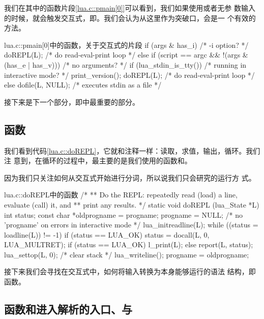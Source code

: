 我们在其中的函数片段\ref{lua.c::pmain[0]}可以看到，我们如果使用或者无参
数输入的时候，就会触发交互式，即。我们会认为从这里作为突破口，会是一
个有效的方法。

\begin{ccode}{lua.c::pmain[0]}{中的函数，关于交互式的片段}
  if (args & has_i)  /* -i option? */
    doREPL(L);  /* do read-eval-print loop */
  else if (script == argc && !(args & (has_e | has_v))) {  /* no arguments? */
    if (lua_stdin_is_tty()) {  /* running in interactive mode? */
      print_version();
      doREPL(L);  /* do read-eval-print loop */
    }
    else dofile(L, NULL);  /* executes stdin as a file */
  }
\end{ccode}

接下来是下一个部分，即中最重要的部分。


\subsection{函数}

我们看到代码\ref{lua.c::doREPL}，它就和注释一样：读取，求值，输出，循环。我们注
意到，在循环的过程中，最主要的是我们使用的函数和。

因为我们只关注如何从交互式开始进行分词，所以说我们只会研究的运行方
式。

\begin{ccode}{lua.c::doREPL}{中的函数}
/*
** Do the REPL: repeatedly read (load) a line, evaluate (call) it, and
** print any results.
*/
static void doREPL (lua_State *L) {
  int status;
  const char *oldprogname = progname;
  progname = NULL;  /* no 'progname' on errors in interactive mode */
  lua_initreadline(L);
  while ((status = loadline(L)) != -1) {
    if (status == LUA_OK)
      status = docall(L, 0, LUA_MULTRET);
    if (status == LUA_OK) l_print(L);
    else report(L, status);
  }
  lua_settop(L, 0);  /* clear stack */
  lua_writeline();
  progname = oldprogname;
}
\end{ccode}

接下来我们会寻找在交互式中，如何将输入转换为本身能够运行的语法
结构，即函数。


\subsection{函数和进入解析的入口、与}

